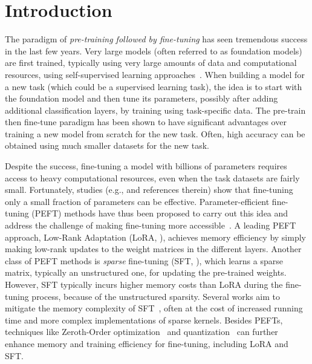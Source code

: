 \section{Introduction}\label{sec:intro}

The paradigm of \emph{pre-training followed by fine-tuning} has seen tremendous success in the last few years. Very large models (often referred to as foundation models) are first trained, typically using very large amounts of data and computational resources, using self-supervised learning approaches~\citep{dosovitskiy2020image, openai2023gpt, dubey2024llama, zhousolving}. When building a model for a new task (which could be a supervised learning task), the idea is to start with the foundation model and then tune its parameters, possibly after adding additional classification layers, by training using task-specific data. The pre-train then fine-tune paradigm has been shown to have significant advantages over training a new model from scratch for the new task. Often, high accuracy can be obtained using much smaller datasets for the new task. 

Despite the success, fine-tuning a model with billions of parameters requires access to heavy computational resources, even when the task datasets are fairly small. Fortunately,  studies (e.g., \citep{panigrahi2023taskspecific} and references therein) show that fine-tuning only a small fraction of parameters can be effective. Parameter-efficient fine-tuning (PEFT) methods have thus been proposed to carry out this idea and address the challenge of making fine-tuning more accessible~\citep{lialin2023scaling}. A leading PEFT approach, Low-Rank Adaptation (LoRA, \citealt{hulora}), achieves memory efficiency by simply making low-rank updates to the weight matrices in the different layers. Another class of PEFT methods is \emph{sparse} fine-tuning (SFT, \citealt{sung2021training, guo2021parameter, ansell2022composable, nikdan2024rosa}), which learns a sparse matrix, typically an unstructured one, for updating the pre-trained weights. However, SFT typically incurs higher memory costs than LoRA during the fine-tuning process, because of the unstructured sparsity. Several works aim to mitigate the memory complexity of SFT~\cite{mofrad2019multithreaded, holmes2021nxmtransformer, pmlr-v202-nikdan23a, nikdan2024rosa}, often at the cost of increased running time and more complex implementations of sparse kernels. Besides PEFTs, techniques like Zeroth-Order optimization~\cite{malladi2023fine, guo2024zeroth} and quantization~\cite{gholami2022survey, dettmers2022gpt3, dettmers2024qlora} can further enhance memory and training efficiency for fine-tuning, including LoRA and SFT. 

